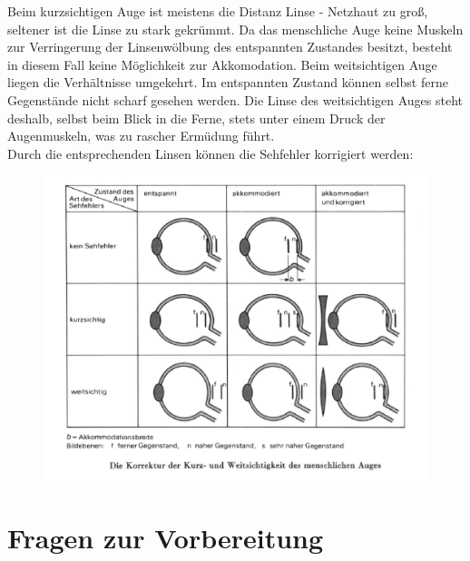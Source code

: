 \noindent
Beim kurzsichtigen Auge ist meistens die Distanz Linse - Netzhaut zu groß, seltener ist die Linse zu stark gekrümmt. Da das menschliche Auge keine Muskeln zur Verringerung der Linsenwölbung des entspannten Zustandes besitzt, besteht in diesem Fall keine Möglichkeit zur Akkomodation. Beim weitsichtigen Auge liegen die Verhältnisse umgekehrt. Im entspannten Zustand können selbst ferne Gegenstände nicht scharf gesehen werden. Die Linse des weitsichtigen Auges steht deshalb, selbst beim Blick in die Ferne, stets unter einem Druck der Augenmuskeln, was zu rascher Ermüdung führt.\\

\noindent
Durch die entsprechenden Linsen können die Sehfehler korrigiert werden:
\begin{figure}[h]
	\centering
		\includegraphics[width=\textwidth]{Versuch_7-8/Abbildungen/Sehfehler.jpg}
	\label{fig:Sehfehler}
\end{figure}

\section{Fragen zur Vorbereitung}

